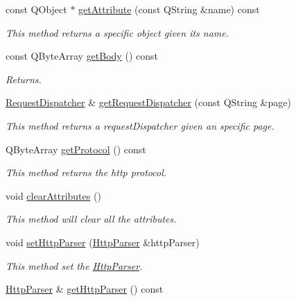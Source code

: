 \begin{DoxyCompactItemize}
const Q\+Object $\ast$ \hyperlink{class_c_w_f_1_1_http_servlet_request_a6833f3628440cfa4a6dc45fcd6783eee}{get\+Attribute} (const Q\+String \&name) const 
\begin{DoxyCompactList}\small\item\em This method returns a specific object given its name. \end{DoxyCompactList}\item 
const Q\+Byte\+Array \hyperlink{class_c_w_f_1_1_http_servlet_request_a9b46d51ca2410ec587f980fc86d75027}{get\+Body} () const 
\begin{DoxyCompactList}\small\item\em Returns. \end{DoxyCompactList}\item 
\hyperlink{class_c_w_f_1_1_request_dispatcher}{Request\+Dispatcher} \& \hyperlink{class_c_w_f_1_1_http_servlet_request_a0ce93d793a178c7e0e5fef4044b48bdc}{get\+Request\+Dispatcher} (const Q\+String \&page)
\begin{DoxyCompactList}\small\item\em This method returns a request\+Dispatcher given an specific page. \end{DoxyCompactList}\item 
Q\+Byte\+Array \hyperlink{class_c_w_f_1_1_http_servlet_request_a487fd95aa9c7f64cfa438097a59a30ca}{get\+Protocol} () const 
\begin{DoxyCompactList}\small\item\em This method returns the http protocol. \end{DoxyCompactList}\item 
void \hyperlink{class_c_w_f_1_1_http_servlet_request_a1e17ba223b17b4b390c9a351d4fff78e}{clear\+Attributes} ()
\begin{DoxyCompactList}\small\item\em This method will clear all the attributes. \end{DoxyCompactList}\item 
void \hyperlink{class_c_w_f_1_1_http_servlet_request_a0c28aa6bbd0cf10b482098c70fe2c0fd}{set\+Http\+Parser} (\hyperlink{class_c_w_f_1_1_http_parser}{Http\+Parser} \&http\+Parser)
\begin{DoxyCompactList}\small\item\em This method set the \hyperlink{class_c_w_f_1_1_http_parser}{Http\+Parser}. \end{DoxyCompactList}\item 
\hyperlink{class_c_w_f_1_1_http_parser}{Http\+Parser} \& \hyperlink{class_c_w_f_1_1_http_servlet_request_a3bb5c268aecca784c632c673078b4150}{get\+Http\+Parser} () const 

\end{DoxyCompactItemize}
